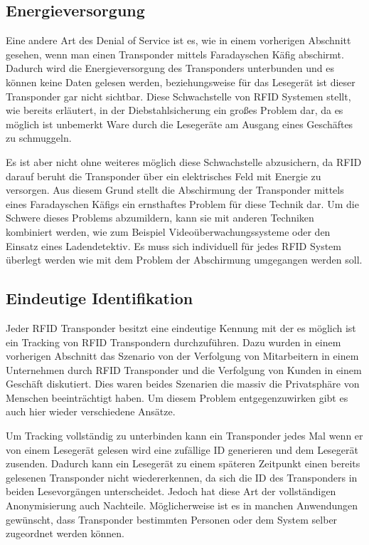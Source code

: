 \documentclass[conference]{IEEEtran}
\begin{document}
\subsection{Energieversorgung}
Eine andere Art des Denial of Service ist es, wie in einem vorherigen Abschnitt gesehen, wenn man einen Transponder mittels Faradayschen Käfig abschirmt. Dadurch wird die Energieversorgung des Transponders unterbunden und es können keine Daten gelesen werden, beziehungsweise für das Lesegerät ist dieser Transponder gar nicht sichtbar. Diese Schwachstelle von RFID Systemen stellt, wie bereits erläutert, in der Diebstahlsicherung ein großes Problem dar, da es möglich ist unbemerkt Ware durch die Lesegeräte am Ausgang eines Geschäftes zu schmuggeln.

Es ist aber nicht ohne weiteres möglich diese Schwachstelle abzusichern, da RFID darauf beruht die Transponder über ein elektrisches Feld mit Energie zu versorgen. Aus diesem Grund stellt die Abschirmung der Transponder mittels eines Faradayschen Käfigs ein ernsthaftes Problem für diese Technik dar. Um die Schwere dieses Problems abzumildern, kann sie mit anderen Techniken kombiniert werden, wie zum Beispiel Videoüberwachungssysteme oder den Einsatz eines Ladendetektiv. Es muss sich individuell für jedes RFID System überlegt werden wie mit dem Problem der Abschirmung umgegangen werden soll.

\subsection{Eindeutige Identifikation}
Jeder RFID Transponder besitzt eine eindeutige Kennung mit der es möglich ist ein Tracking von RFID Transpondern durchzuführen. Dazu wurden in einem vorherigen Abschnitt das Szenario von der Verfolgung von Mitarbeitern in einem Unternehmen durch RFID Transponder und die Verfolgung von Kunden in einem Geschäft diskutiert. Dies waren beides Szenarien die massiv die Privatsphäre von Menschen beeinträchtigt haben. Um diesem Problem entgegenzuwirken gibt es auch hier wieder verschiedene Ansätze.

Um Tracking vollständig zu unterbinden kann ein Transponder jedes Mal wenn er von einem Lesegerät gelesen wird eine zufällige ID generieren und dem Lesegerät zusenden. Dadurch kann ein Lesegerät zu einem späteren Zeitpunkt einen bereits gelesenen Transponder nicht wiedererkennen, da sich die ID des Transponders in beiden Lesevorgängen unterscheidet. Jedoch hat diese Art der vollständigen Anonymisierung auch Nachteile. Möglicherweise ist es in manchen Anwendungen gewünscht, dass Transponder bestimmten Personen oder dem System selber zugeordnet werden können.
\end{document}

